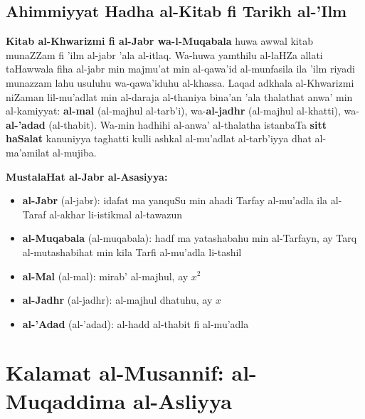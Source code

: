 \documentclass[11pt,a4paper]{book}
\begin{document}
\section*{Ahimmiyyat Hadha al-Kitab fi Tarikh al-'Ilm}

\begin{commentary}
\textbf{Kitab al-Khwarizmi fi al-Jabr wa-l-Muqabala} huwa awwal kitab
munaZZam fi 'ilm al-jabr 'ala al-itlaq. Wa-huwa yamthilu al-laHZa allati
taHawwala fiha al-jabr min majmu'at min al-qawa'id al-munfasila ila 'ilm
riyadi munazzam lahu usuluhu wa-qawa'iduhu al-khassa. Laqad adkhala
al-Khwarizmi niZaman lil-mu'adlat min al-daraja al-thaniya bina'an 'ala
thalathat anwa' min al-kamiyyat: \textbf{al-mal} (al-majhul al-tarb'i),
wa-\textbf{al-jadhr} (al-majhul al-khatti), wa-\textbf{al-'adad} (al-thabit).
Wa-min hadhihi al-anwa' al-thalatha istanbaTa \textbf{sitt haSalat}
kanuniyya taghatti kulli ashkal al-mu'adlat al-tarb'iyya dhat al-ma'amilat
al-mujiba.

\vspace{0.3cm}

\textbf{MustalaHat al-Jabr al-Asasiyya:}
\begin{itemize}[rightmargin=1em]
  \item \textbf{al-Jabr} (al-jabr): idafat ma yanquSu min ahadi
    Tarfay al-mu'adla ila al-Taraf al-akhar li-istikmal al-tawazun
  \item \textbf{al-Muqabala} (al-muqabala): hadf ma yatashabahu min
    al-Tarfayn, ay Tarq al-mutashabihat min kila Tarfi al-mu'adla
    li-tashil
  \item \textbf{al-Mal} (al-mal): mirab' al-majhul, ay $x^2$
  \item \textbf{al-Jadhr} (al-jadhr): al-majhul dhatuhu, ay $x$
  \item \textbf{al-'Adad} (al-'adad): al-hadd al-thabit fi al-mu'adla
\end{itemize}
\end{commentary}

\newpage

\chapter*{Kalamat al-Musannif: al-Muqaddima al-Asliyya}
\end{document}
